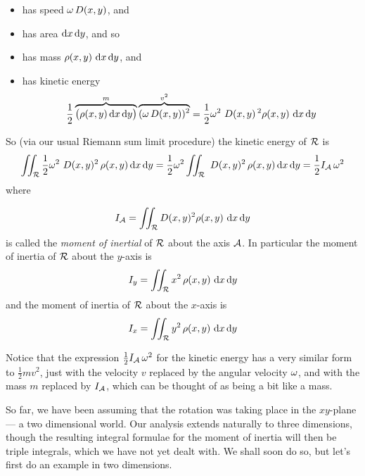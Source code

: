 \begin{itemize}\itemsep1pt \parskip0pt 
\item 
has speed $\omega\,D(x,y)$, and
\item 
has area $\mathrm{d}x\,\mathrm{d}y$, and so
\item
has mass $\rho(x,y)\ \dee{x}\,\dee{y}$, and
\item
has kinetic energy 
\begin{equation*}
\frac{1}{2}\overbrace{\big(\rho(x,y)\,\dee{x}\,\dee{y}\big)}^{m}
                \overbrace{(\om\,D(x,y))^2}^{v^2}
 =\frac{1}{2}\om^2\ D(x,y)\,^2\rho(x,y)\ \dee{x}\,\dee{y}
\end{equation*}
\end{itemize}
So (via our usual Riemann sum limit procedure) 
the kinetic energy of $\mathcal{R}$ is
\begin{equation*}
\dblInt_\cR \frac{1}{2}\om^2\ D(x,y)^2\,\rho(x,y)\,\dee{x}\,\dee{y}
=\frac{1}{2}\om^2 \dblInt_\cR \ D(x,y)^2\,\rho(x,y)\,\dee{x}\,\dee{y}
=\frac{1}{2} I_\cA\,\om^2
\end{equation*}
where
\begin{defn}\label{def moment of inertia}
\begin{equation*}
I_\cA=\dblInt_\cR D(x,y)^2\rho(x,y)\ \dee{x}\,\dee{y}
\end{equation*}
is called the \emph{moment of inertial} of $\mathcal{R}$ about the axis $\mathcal{A}$.
In particular the moment of inertia of $\mathcal{R}$ about the $y$-axis is
\begin{equation*}
I_y=\dblInt_\cR x^2\,\rho(x,y)\ \dee{x}\,\dee{y}
\end{equation*}
and the moment of inertia of $\mathcal{R}$ about the $x$-axis is
\begin{equation*}
I_x=\dblInt_\cR y^2\,\rho(x,y)\ \dee{x}\,\dee{y}
\end{equation*}

\end{defn}
\noindent
Notice that the expression $\frac{1}{2} I_{\mathcal{A}}\,\omega^2$ for the kinetic 
energy has  a very similar form 
to $\frac{1}{2} m v^2$, just with the velocity $v$ replaced by the angular
velocity $\omega$, and with the mass $m$ replaced by $I_{\mathcal{A}}$, which can be thought
of as being a bit like a mass.

So far, we have been assuming that the rotation was taking place in the
$xy$-plane --- a two dimensional world. Our analysis extends naturally
to three dimensions, though the resulting integral formulae for the
moment of inertia will then be triple integrals, which we have not yet
dealt with. We shall soon do so, but let's first do an example in two
dimensions.

